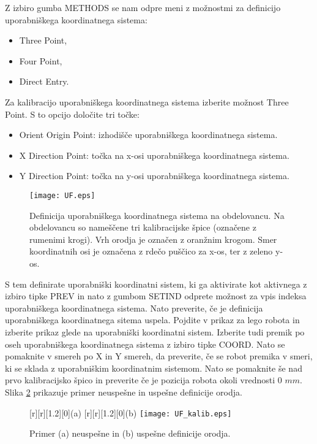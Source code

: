 Z izbiro gumba METHODS se nam odpre meni z možnostmi za definicijo uporabniškega koordinatnega sistema:

\begin{itemize}
	\item Three Point,
	\item Four Point,
	\item Direct Entry.
\end{itemize}

Za kalibracijo uporabniškega koordinatnega sistema izberite možnost Three Point. S to opcijo določite tri točke:

\begin{itemize}
	\item Orient Origin Point: izhodišče uporabniškega koordinatnega sistema.
	\item X Direction Point: točka na x-osi uporabniškega koordinatnega sistema.
	\item Y Direction Point: točka na y-osi uporabniškega koordinatnega sistema.
\end{itemize}

\begin{figure}[!hbt]
	\centering
	\texttt{[image: UF.eps]}
	\caption{Definicija uporabniškega koordinatnega sistema na obdelovancu. Na obdelovancu so nameščene tri kalibracijske špice (označene z rumenimi krogi). Vrh orodja je označen z oranžnim krogom. Smer koordinatnih osi je označena z rdečo puščico za x-os, ter z zeleno y-os.}
	\label{fig:UFrame}
\end{figure}

S tem definirate uporabniški koordinatni sistem, ki ga aktivirate kot aktivnega z izbiro tipke PREV in nato z gumbom SETIND odprete možnost za vpis indeksa uporabniškega koordinatnega sistema. Nato preverite, če je definicija uporabniškega koordinatnega sitema uspela. Pojdite v prikaz za lego robota in izberite prikaz glede na uporabniški koordinatni sistem. Izberite tudi premik po oseh uporabniškega koordinatnega sistema z izbiro tipke COORD. Nato se pomaknite v smereh po X in Y smereh, da preverite, če se robot premika v smeri, ki se sklada z uporabniškim koordinatnim sistemom. Nato se pomaknite še nad prvo kalibracijsko špico in preverite če je pozicija robota okoli vrednosti $0$ $mm$. Slika \ref{fig:UF_kalib} prikazuje primer neuspešne in uspešne definicije orodja.


\begin{figure}[!htb]
	\centering
	[r][1.2][0]{(a)}
	[r][1.2][0]{(b)}
	\texttt{[image: UF\_kalib.eps]}
	\caption{Primer (a) neuspešne in (b) uspešne definicije orodja.}
	\label{fig:UF_kalib}
\end{figure}



